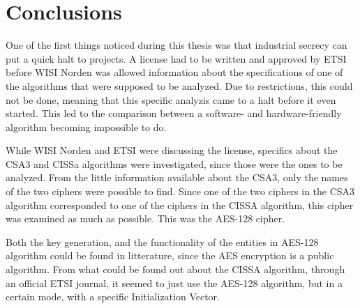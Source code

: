 \section{Conclusions}
One of the first things noticed during this thesis was that industrial
secrecy can put a quick halt to projects. A license had to be written 
and approved by ETSI before WISI Norden was allowed information about 
the specifications of one of the algorithms that were supposed to be
analyzed. Due to restrictions, this could not be done, meaning that 
this specific analyzis came to a halt before it even started. This 
led to the comparison between a software- and hardware-friendly 
algorithm becoming impossible to do. 

While WISI Norden and ETSI were discussing the license, specifics about 
the CSA3 and CISSa algorithms were investigated, since those were the 
ones to be analyzed. From the little information available about 
the CSA3, only the names of the two ciphers were possible to find. 
Since one of the two ciphers in the CSA3 algorithm corresponded to one 
of the ciphers in the CISSA algorithm, this cipher was examined as much 
as possible. This was the AES-128 cipher.

Both the key generation, and the functionality of the entities in 
AES-128 algorithm could be found in litterature, since the AES 
encryption is a public algorithm. From what could be found out about 
the CISSA algorithm, through an official ETSI journal, it seemed to 
just use the AES-128 algorithm, but in a certain mode, with a specific 
Initialization Vector.
